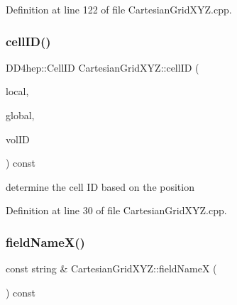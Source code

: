 Definition at line 122 of file Cartesian\+Grid\+X\+Y\+Z.\+cpp.

\hypertarget{class_d_d4hep_1_1_geometry_1_1_cartesian_grid_x_y_z_a8dedaeb385bc59155413184fc796aa56}{}\label{class_d_d4hep_1_1_geometry_1_1_cartesian_grid_x_y_z_a8dedaeb385bc59155413184fc796aa56} 
\subsubsection{\texorpdfstring{cell\+I\+D()}{cellID()}}
{\footnotesize\ttfamily D\+D4hep\+::\+Cell\+ID Cartesian\+Grid\+X\+Y\+Z\+::cell\+ID (\begin{DoxyParamCaption}\item[{const \hyperlink{namespace_d_d4hep_1_1_geometry_a55083902099d03506c6db01b80404900}{Position} \&}]{local,  }\item[{const \hyperlink{namespace_d_d4hep_1_1_geometry_a55083902099d03506c6db01b80404900}{Position} \&}]{global,  }\item[{const Volume\+ID \&}]{vol\+ID }\end{DoxyParamCaption}) const}



determine the cell ID based on the position 



Definition at line 30 of file Cartesian\+Grid\+X\+Y\+Z.\+cpp.

\hypertarget{class_d_d4hep_1_1_geometry_1_1_cartesian_grid_x_y_z_a7eed50ee95125da7cfded93eb1bbe7f1}{}\label{class_d_d4hep_1_1_geometry_1_1_cartesian_grid_x_y_z_a7eed50ee95125da7cfded93eb1bbe7f1} 
\subsubsection{\texorpdfstring{field\+Name\+X()}{fieldNameX()}}
{\footnotesize\ttfamily const string \& Cartesian\+Grid\+X\+Y\+Z\+::field\+NameX (\begin{DoxyParamCaption}{ }\end{DoxyParamCaption}) const}



